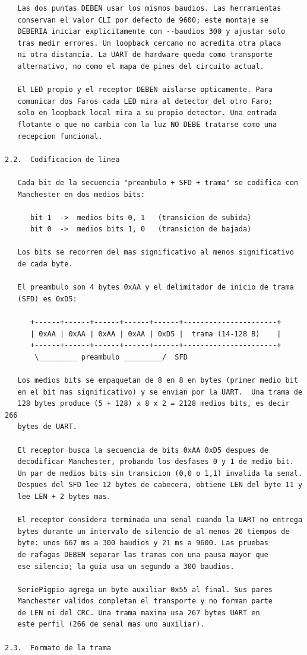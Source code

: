 \newpage
\begin{Verbatim}
   Las dos puntas DEBEN usar los mismos baudios. Las herramientas
   conservan el valor CLI por defecto de 9600; este montaje se
   DEBERIA iniciar explicitamente con --baudios 300 y ajustar solo
   tras medir errores. Un loopback cercano no acredita otra placa
   ni otra distancia. La UART de hardware queda como transporte
   alternativo, no como el mapa de pines del circuito actual.

   El LED propio y el receptor DEBEN aislarse opticamente. Para
   comunicar dos Faros cada LED mira al detector del otro Faro;
   solo en loopback local mira a su propio detector. Una entrada
   flotante o que no cambia con la luz NO DEBE tratarse como una
   recepcion funcional.

2.2.  Codificacion de linea

   Cada bit de la secuencia "preambulo + SFD + trama" se codifica con
   Manchester en dos medios bits:

      bit 1  ->  medios bits 0, 1   (transicion de subida)
      bit 0  ->  medios bits 1, 0   (transicion de bajada)

   Los bits se recorren del mas significativo al menos significativo
   de cada byte.

   El preambulo son 4 bytes 0xAA y el delimitador de inicio de trama
   (SFD) es 0xD5:

      +------+------+------+------+------+----------------------+
      | 0xAA | 0xAA | 0xAA | 0xAA | 0xD5 |  trama (14-128 B)    |
      +------+------+------+------+------+----------------------+
       \_________ preambulo _________/  SFD

   Los medios bits se empaquetan de 8 en 8 en bytes (primer medio bit
   en el bit mas significativo) y se envian por la UART.  Una trama de
   128 bytes produce (5 + 128) x 8 x 2 = 2128 medios bits, es decir 266
   bytes de UART.

   El receptor busca la secuencia de bits 0xAA 0xD5 despues de
   decodificar Manchester, probando los desfases 0 y 1 de medio bit.
   Un par de medios bits sin transicion (0,0 o 1,1) invalida la senal.
   Despues del SFD lee 12 bytes de cabecera, obtiene LEN del byte 11 y
   lee LEN + 2 bytes mas.

   El receptor considera terminada una senal cuando la UART no entrega
   bytes durante un intervalo de silencio de al menos 20 tiempos de
   byte: unos 667 ms a 300 baudios y 21 ms a 9600. Las pruebas
   de rafagas DEBEN separar las tramas con una pausa mayor que
   ese silencio; la guia usa un segundo a 300 baudios.

   SeriePigpio agrega un byte auxiliar 0x55 al final. Sus pares
   Manchester validos completan el transporte y no forman parte
   de LEN ni del CRC. Una trama maxima usa 267 bytes UART en
   este perfil (266 de senal mas uno auxiliar).

2.3.  Formato de la trama
\end{Verbatim}
